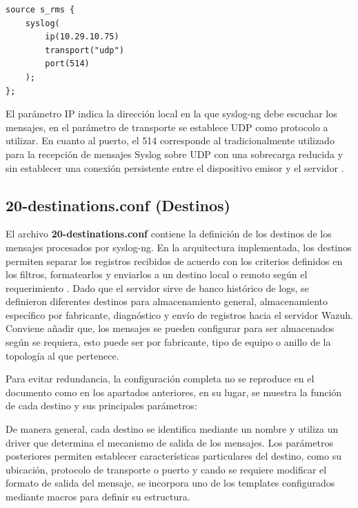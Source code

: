 \begin{lstlisting}[style=logstyle,
    caption={Configuracion de fuentes presente en el servidor centralizado de logs.}
]
source s_rms {
    syslog(
        ip(10.29.10.75)
        transport("udp")
        port(514)
    );
};
\end{lstlisting}

El parámetro IP indica la dirección local en la que syslog-ng debe escuchar los mensajes, en el parámetro de transporte se establece UDP como protocolo a utilizar.
En cuanto al puerto, el 514 corresponde al tradicionalmente utilizado para la recepción de mensajes Syslog sobre UDP con una sobrecarga reducida y sin establecer una conexión persistente entre el dispositivo emisor y el servidor \cite{syslogng_sources}.

\subsection{20-destinations.conf (Destinos)}
El archivo \textbf{20-destinations.conf} contiene la definición de los destinos de los mensajes procesados por syslog-ng.
En la arquitectura implementada, los destinos permiten separar los registros recibidos de acuerdo con los criterios definidos en los filtros, formatearlos y enviarlos a un destino local o remoto según el requerimiento \cite{syslogng_destinations}.
Dado que el servidor sirve de banco histórico de logs, se definieron diferentes destinos para almacenamiento general, almacenamiento específico por fabricante, diagnóstico y envío de registros hacia el servidor Wazuh. Conviene añadir que, los mensajes se pueden configurar para ser almacenados según se requiera, esto puede ser por fabricante, tipo de equipo o anillo de la topología al que pertenece.

Para evitar redundancia, la configuración completa no se reproduce en el documento como en los apartados anteriores, en su lugar, se muestra la función de cada destino y sus principales parámetros:



De manera general, cada destino se identifica mediante un nombre y utiliza un driver que determina el mecanismo de salida de los mensajes. Los parámetros posteriores permiten establecer características particulares del destino, como su ubicación, protocolo de transporte o puerto y cando se requiere modificar el formato de salida del mensaje, se incorpora uno de los templates configurados mediante macros para definir su estructura.


